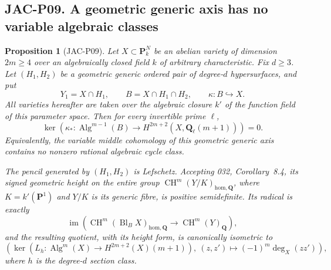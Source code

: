 \documentclass[11pt,a4paper]{article}
\newtheorem{proposition}[theorem]{Proposition}
\begin{document}
\subsection*{JAC-P09. A geometric generic axis has no variable algebraic classes}

\begin{proposition}[JAC-P09]
\label{jac:P09}
Let $X\subset\mathbf P^N_k$ be an abelian variety of dimension
$2m\ge4$ over an algebraically closed field $k$ of arbitrary
characteristic. Fix $d\ge3$. Let $(H_1,H_2)$ be a geometric generic
ordered pair of degree-$d$ hypersurfaces, and put
\[
 Y_1=X\cap H_1,\qquad B=X\cap H_1\cap H_2,
 \qquad \kappa:B\hookrightarrow X.
\]
All varieties hereafter are taken over the algebraic closure $k'$ of
the function field of this parameter space. Then for every invertible
prime $\ell$,
\[
 \ker\!\left(\kappa_*:\operatorname{Alg}^{m-1}(B)
             \longrightarrow H^{2m+2}(X,\mathbf Q_\ell(m+1))\right)=0.
                                                        \tag{JAC.P09.1}
\]
Equivalently, the variable middle cohomology of this geometric generic
axis contains no nonzero rational algebraic cycle class.

The pencil generated by $(H_1,H_2)$ is Lefschetz. Accepting 032,
Corollary~8.4, its signed geometric height on the entire group
$\operatorname{CH}^{m}(Y/K)_{\mathrm{hom},\mathbf Q}$, where
$K=k'(\mathbf P^1)$ and $Y/K$ is its generic fibre, is positive
semidefinite. Its radical is exactly
\[
 \operatorname{im}\!\left(
  \operatorname{CH}^{m}(\operatorname{Bl}_B X)_{
       \mathrm{hom},\mathbf Q}
     \longrightarrow\operatorname{CH}^{m}(Y)_{\mathbf Q}\right),
                                                        \tag{JAC.P09.2}
\]
and the resulting quotient, with its height form, is canonically
isometric to
\[
 \left(\ker\!\left(L_h:\operatorname{Alg}^{m}(X)
                        \longrightarrow H^{2m+2}(X)(m+1)\right),
       \ (z,z')\longmapsto(-1)^m\deg_X(zz')\right),
                                                        \tag{JAC.P09.3}
\]
where $h$ is the degree-$d$ section class.
\end{proposition}
\end{document}
